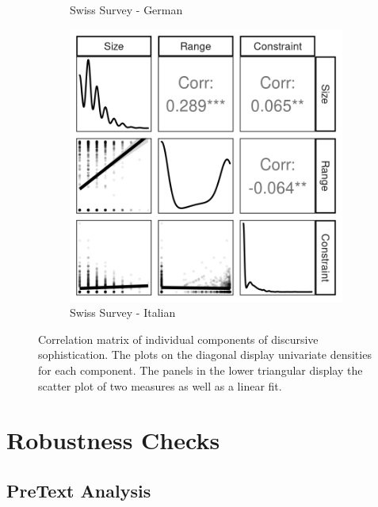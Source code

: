 \begin{figure}[h]
\begin{subfigure}[h]{0.27\textwidth}
		\caption{Swiss Survey - German}
	\end{subfigure}%
	\begin{subfigure}[h]{0.27\textwidth}
		\centering
		\includegraphics[width=\textwidth]{../fig/italian_components.png}
		\caption{Swiss Survey - Italian}
	\end{subfigure}
    \caption[Correlation matrix of individual components of discursive sophistication.]{Correlation matrix of individual components of discursive sophistication. The plots on the diagonal display univariate densities for each component. The panels in the lower triangular display the scatter plot of two measures as well as a linear fit. %
     }\label{fig:components}
\end{figure}



\clearpage
\section{Robustness Checks}\label{app:robustness}

\subsection{PreText Analysis}\label{app:topicmodel}


